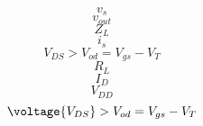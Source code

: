 \documentclass[letterpaper 12pt]{book}
\begin{document}
\[ v_s \]
\[ v_{out} \]
\[ Z_L \]
\[ i_s \]
\[ V_{DS} > V_{od} = V_{gs} - V_T\]
\[ R_L \]
\[ I_D \]
\[ V_{DD} \]
\[ \voltage{V_{DS}} > V_{od} = V_{gs} - V_T\]
\end{document}
